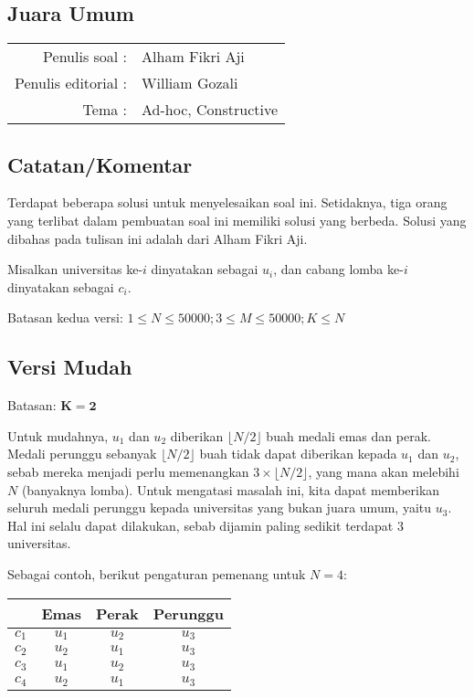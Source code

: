 \documentclass[../main_editorial.tex]{subfiles} %
\newcommand{\problemName}{Juara Umum}
\newcommand{\problemWriter}{Alham Fikri Aji}
\newcommand{\problemEditorialWriter}{William Gozali}
\newcommand{\problemTags}{Ad-hoc, Constructive}
\begin{document}
\begin{center}
    \section*{\problemName}
    \addcontentsline{toc}{section}{\problemName} %
    
    \begin{tabular}{rl}
    Penulis soal : & \problemWriter \\
    Penulis editorial : & \problemEditorialWriter \\
    Tema : & \problemTags
    \end{tabular}
\end{center}

\subsection*{Catatan/Komentar}

Terdapat beberapa solusi untuk menyelesaikan soal ini. Setidaknya, tiga orang yang terlibat dalam pembuatan soal ini memiliki solusi yang berbeda. Solusi yang dibahas pada tulisan ini adalah dari Alham Fikri Aji.

Misalkan universitas ke-$i$ dinyatakan sebagai $u_i$, dan cabang lomba ke-$i$ dinyatakan sebagai $c_i$.

Batasan kedua versi: $1 \le N \le 50000; 3 \le M \le 50000; K \le N$

\subsection*{Versi Mudah}
Batasan: $\mathbf{K = 2}$

Untuk mudahnya, $u_1$ dan $u_2$ diberikan $\lfloor N/2 \rfloor$ buah medali emas dan perak. Medali perunggu sebanyak $\lfloor N/2 \rfloor$ buah tidak dapat diberikan kepada $u_1$ dan $u_2$, sebab mereka menjadi perlu memenangkan $3 \times \lfloor N/2 \rfloor$, yang mana akan melebihi $N$ (banyaknya lomba). Untuk mengatasi masalah ini, kita dapat memberikan seluruh medali perunggu kepada universitas yang bukan juara umum, yaitu $u_3$. Hal ini selalu dapat dilakukan, sebab dijamin paling sedikit terdapat $3$ universitas.

Sebagai contoh, berikut pengaturan pemenang untuk $N=4$:

\begin{table}[!h]
\centering
\begin{tabular}{|c||c|c|c|}
\hline  & Emas & Perak & Perunggu \\ 
\hline $c_1$ & $u_1$ & $u_2$ & $u_3$ \\ 
\hline $c_2$ & $u_2$ & $u_1$ & $u_3$ \\ 
\hline $c_3$ & $u_1$ & $u_2$ & $u_3$ \\ 
\hline $c_4$ & $u_2$ & $u_1$ & $u_3$ \\ 
\hline 
\end{tabular} 
\end{table}
\end{document}

